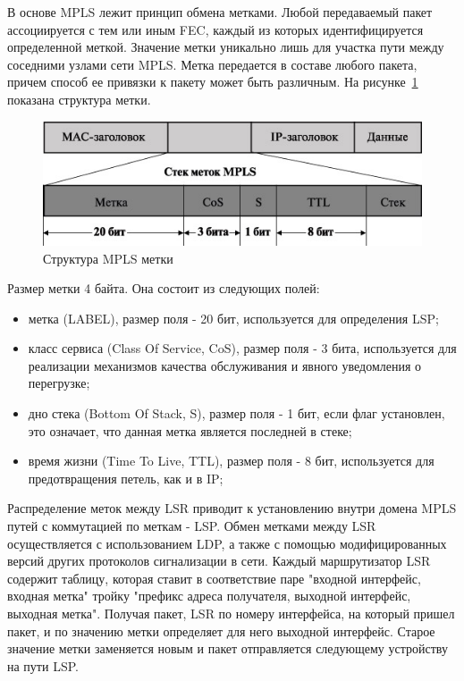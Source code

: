 В основе MPLS лежит принцип обмена метками. Любой передаваемый пакет ассоциируется с тем или иным FEC, каждый из которых идентифицируется определенной меткой. Значение метки уникально лишь для участка пути между соседними узлами сети MPLS. Метка передается в составе любого пакета, причем способ ее привязки к пакету может быть различным. На рисунке~\ref{pic:mpls_label} показана структура метки.
\begin{figure}[h]
\centering
\includegraphics[scale=0.5]{pictures/mpls_label}
\caption{Структура MPLS метки}
\label{pic:mpls_label}
\end{figure}

Размер метки 4 байта. Она состоит из следующих полей:
\begin{itemize}
\item метка (LABEL), размер поля - 20 бит, используется для определения LSP;
\item класс сервиса (Class Of Service, CoS), размер поля - 3 бита, используется для реализации механизмов качества обслуживания и явного уведомления о перегрузке;
\item дно стека (Bottom Of Stack, S), размер поля - 1 бит, если флаг установлен, это означает, что данная метка является последней в стеке;
\item время жизни (Time To Live, TTL), размер поля - 8 бит, используется для предотвращения петель, как и в IP;
\end{itemize}

Распределение меток между LSR приводит к установлению внутри домена MPLS путей с коммутацией по меткам - LSP. Обмен метками между LSR осуществляется с использованием LDP, а также с помощью модифицированных версий других протоколов сигнализации в сети. Каждый маршрутизатор LSR содержит таблицу, которая ставит в соответствие паре "входной интерфейс, входная метка" тройку "префикс адреса получателя, выходной интерфейс, выходная метка". Получая пакет, LSR по номеру интерфейса, на который пришел пакет, и по значению метки определяет для него выходной интерфейс. Старое значение метки заменяется новым и пакет отправляется следующему устройству на пути LSP.

